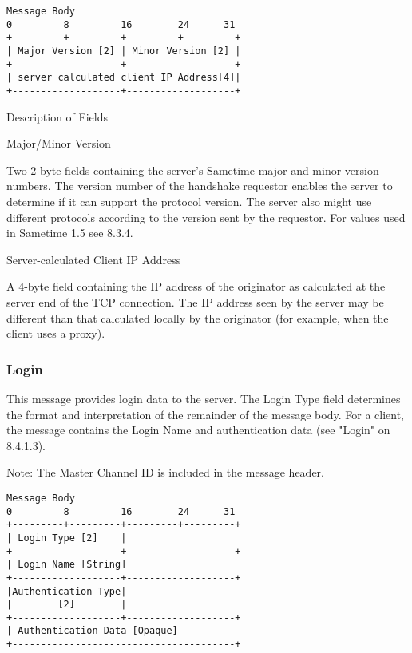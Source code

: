 \documentclass[titlepage,oneside]{book}
\begin{document}
\begin{verbatim}
Message Body
0         8         16        24      31
+---------+---------+---------+---------+
| Major Version [2] | Minor Version [2] |
+-------------------+-------------------+
| server calculated client IP Address[4]|
+-------------------+-------------------+
\end{verbatim}

\par{} Description of Fields

\par{} Major/Minor Version

\subpar{}  Two 2-byte fields containing the server's Sametime major and minor
  version numbers. The version number of the handshake requestor
  enables the server to determine if it can support the protocol
  version. The server also might use different protocols according to
  the version sent by the requestor.  For values used in Sametime 1.5
  see 8.3.4.

\par{} Server-calculated Client IP Address

\subpar{}  A 4-byte field containing the IP address of the originator as
  calculated at the server end of the TCP connection. The IP address
  seen by the server may be different than that calculated locally by
  the originator (for example, when the client uses a proxy).

\subsubsection{Login}

\par{} This message provides login data to the server. The Login Type field
determines the format and interpretation of the remainder of the
message body. For a client, the message contains the Login Name and
authentication data (see "Login" on 8.4.1.3).

\par{} Note: The Master Channel ID is included in the message header.

\begin{verbatim}
Message Body
0         8         16        24      31
+---------+---------+---------+---------+
| Login Type [2]    |
+-------------------+-------------------+
| Login Name [String]
+-------------------+-------------------+
|Authentication Type|
|        [2]        |
+-------------------+-------------------+
| Authentication Data [Opaque]
+---------------------------------------+
\end{verbatim}
\end{document}
